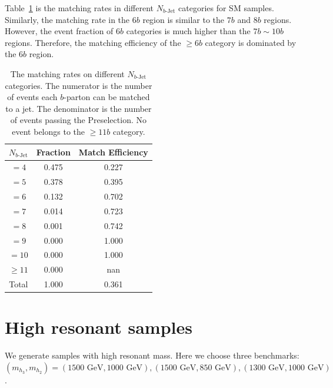 \documentclass[12pt]{article}
\begin{document}
    Table~\ref{tab:sm_match_rate_nbj_11b} is the matching rates in different $N_{b\text{-Jet}}$ categories for SM samples. Similarly, the matching rate in the $6b$ region is similar to the $7b$ and $8b$ regions. However, the event fraction of $6b$ categories is much higher than the $7b \sim 10b$ regions. Therefore, the matching efficiency of the $\ge 6b$ category is dominated by the $6b$ region.   
	\begin{table}[htpb]
		\centering
        \caption{The matching rates on different $N_{b\text{-Jet}}$ categories. The numerator is the number of events each $b$-parton can be matched to a jet. The denominator is the number of events passing the Preselection. No event belongs to the $\ge 11b$ category.}
		\label{tab:sm_match_rate_nbj_11b}
		\begin{tabular}{c|c|c}
        $N_{b\text{-Jet}}$    & Fraction  & Match Efficiency     \\ \hline
        $=4$                  & 0.475 & 0.227 \\
        $=5$                  & 0.378 & 0.395 \\
        $=6$                  & 0.132 & 0.702 \\
        $=7$                  & 0.014 & 0.723 \\
        $=8$                  & 0.001 & 0.742 \\
        $=9$                  & 0.000 & 1.000 \\
        $=10$                 & 0.000 & 1.000 \\
        $\ge 11$              & 0.000 & nan   \\ \hline
        Total                 & 1.000 & 0.361
		\end{tabular}
	\end{table}
\section{High resonant samples}%
\label{sec:high_resonant_samples}
	We generate samples with high resonant mass. Here we choose three benchmarks: $(m_{h_3}, m_{h_2}) = (\text{1500 GeV}, \text{1000 GeV}), (\text{1500 GeV},\text{850 GeV}), (\text{1300 GeV}, \text{1000 GeV})$.
\end{document}
